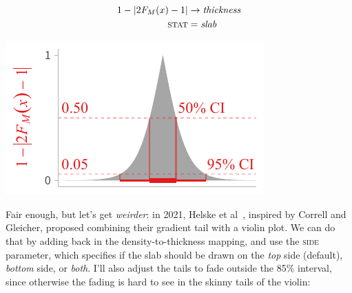 \documentclass[journal]{vgtc}              %
\begin{document}
\noindent
\begin{minipage}{.5\columnwidth}

\begin{align*}
1 - \lvert 2 F_M(x) - 1 \rvert &\rightarrow \textit{thickness}\\
\textsc{stat} &= \mathit{slab}
\end{align*}
\end{minipage}%
  \begin{minipage}{.4\columnwidth}
    \centering
    \includegraphics[width=1.2\columnwidth]{figs/3-slab_consonance.pdf}
  \end{minipage}
\hfill\break

Fair enough, but let's get \textit{weirder}: in 2021, Helske et al~\cite{helske2021can}, inspired by Correll and Gleicher, proposed combining their gradient tail with a violin plot. We can do that by adding back in the density-to-thickness mapping, and use the \textsc{side} parameter, which specifies if the slab should be drawn on the \textit{top} side (default), \textit{bottom} side, or \textit{both}. I'll also adjust the tails to fade outside the 85\% interval, since otherwise the fading is hard to see in the skinny tails of the violin:
\end{document}
